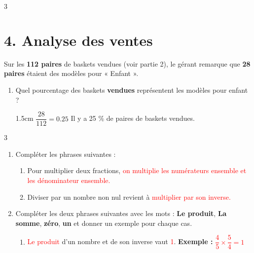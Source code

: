 \documentclass[a4paper]{book}
\begin{document}
{\begin{exerciceNote}{3}
        \section*{4. Analyse des ventes}
        Sur les \textbf{112 paires} de baskets vendues (voir partie 2), le gérant remarque que \textbf{28 paires} étaient des modèles pour « Enfant ».
        
        \begin{enumerate}[resume, leftmargin=*]
            \item Quel pourcentage des baskets \textbf{vendues} représentent les modèles pour enfant ?
            
            \begin{ZoneReponse}{1.5cm}    
                $\dfrac{28}{112}=0.25$
                \quad Il y a 25 \% de paires de baskets vendues.
            \end{ZoneReponse}
        \end{enumerate}  
    \end{exerciceNote}


\newpage

\setcounter{exo}{1}



    \begin{exerciceNote}{3}
        \begin{enumerate}[leftmargin=*]
            \item Compléter les phrases suivantes :
    
            \begin{enumerate}[leftmargin=*]    
                \item Pour multiplier deux fractions, \textcolor{red}{on multiplie les numérateurs ensemble et les dénominateur ensemble.}

                \medskip
    
                \item Diviser par un nombre non nul revient à  \textcolor{red}{multiplier par son inverse.}

                \medskip
            \end{enumerate}
    
            \item Compléter les deux phrases suivantes avec les mots : \textbf{Le produit}, \textbf{La somme}, \textbf{zéro}, \textbf{un} et donner un exemple pour chaque cas.

            \begin{enumerate}[leftmargin=*]
                \item \textcolor{red}{Le produit} d'un nombre et de son inverse vaut \textcolor{red}{1}. \quad \textbf{Exemple : } \textcolor{red}{$\dfrac{4}{5}\times\dfrac{5}{4}=1$}


\end{enumerate}
\end{enumerate}
\end{exerciceNote}}
\end{document}
